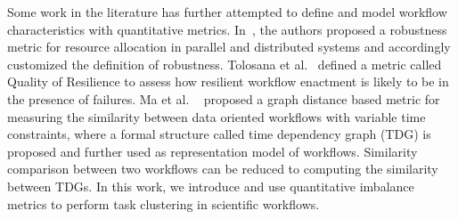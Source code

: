 Some work in the literature has further attempted to define and model workflow characteristics with quantitative metrics. In~\cite{Ali2004}, the authors proposed a robustness metric for resource allocation in parallel and distributed systems and accordingly customized the definition of robustness. Tolosana et al.~\cite{Tolosana2011} defined a metric called Quality of Resilience to assess how resilient workflow enactment is likely to be in the presence of failures. Ma et al. ~\cite{Ma:2014:GDB:2560969.2561388} proposed a graph distance based metric for measuring the similarity between data oriented workflows with variable time constraints, where a formal structure called time dependency graph (TDG) is proposed and further used as representation model of workflows. Similarity comparison between two workflows can be reduced to computing the similarity between TDGs. In this work, we introduce and use quantitative imbalance metrics to perform task clustering in scientific workflows.

